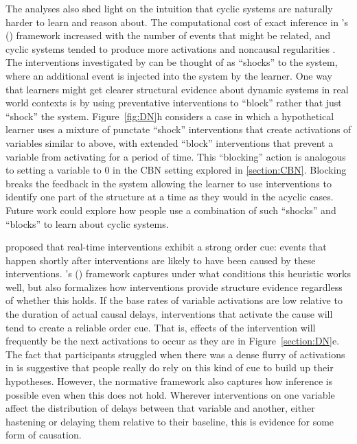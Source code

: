\documentclass{cambridge7A}%
\def\citeapos#1{\citeauthor{#1}'s (\citeyear{#1})}
\begin{document}
The analyses also shed light on the intuition that cyclic systems are naturally harder to learn and reason about. The computational cost of exact inference in \citeapos{bramley2018time} framework increased with the number of events that might be related, and cyclic systems tended to produce more activations and noncausal regularities 
.  
The interventions investigated by \cite{bramley2017dynamic} can be thought of as ``shocks'' to the system, where an additional event is injected into the system by the learner.  One way that learners might get clearer structural evidence about dynamic systems in real world contexts is by using preventative interventions to ``block'' rather that just ``shock'' the system.  Figure~\ref{fig:DN}h considers a case in which a hypothetical learner uses a mixture of punctate ``shock'' interventions that create activations of variables similar to above, with extended ``block'' interventions that prevent a variable from activating for a period of time.  This ``blocking'' action is analogous to setting a variable to 0 in the CBN setting explored in \ref{section:CBN}.  %
Blocking breaks the feedback in the system allowing the learner to use interventions to identify one part of the structure at a time as they would in the acyclic cases.  Future work could explore how people use a combination of such ``shocks'' and ``blocks'' to learn about cyclic systems.

\cite{lagnado2004advantage} proposed that real-time interventions exhibit a strong order cue: events that happen shortly after interventions are likely to have been caused by these interventions.  \citeapos{bramley2018time} framework captures under what conditions this heuristic works well, but also formalizes how interventions provide structure evidence regardless of whether this holds.  If the base rates of variable activations are low relative to the duration of actual causal delays, interventions that activate the cause will tend to create a reliable order cue.  That is, effects of the intervention will frequently be the next activations to occur as they are in Figure~\ref{section:DN}e.  The fact that participants struggled when there was a dense flurry of activations in \cite{bramley2017dynamic} is suggestive that people really do rely on this kind of cue to build up their hypotheses.  
However, the normative framework also captures how inference is possible even when this does not hold.  Wherever interventions on one variable affect the distribution of delays between that variable and another, either hastening or delaying them relative to their baseline, this is evidence for some form of causation.
\end{document}
